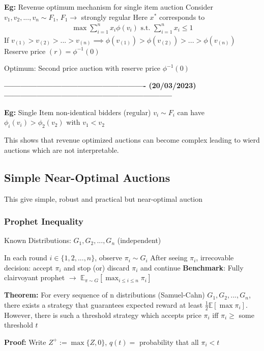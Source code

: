 \documentclass[11pt]{article}
\begin{document}
\textbf{Eg:} Revenue optimum mechanism for single item auction
Consider \(v_1, v_2, ..., v_n \sim F_1\), \(F_1 \rightarrow\) strongly regular
Here \(x^{*}\) corresponds to
\begin{align*}
\max \sum_{i=1}^n x_i \phi(v_i) \text{  s.t.  } \sum_{i=1}^n x_i \leq 1
\end{align*}
If \(v_{(1)} > v_{(2)} > ... > v_{(n)} \implies \phi(v_{(1)}) > \phi(v_{(2)}) > ... > \phi(v_{(n)})\) 
Reserve price \((r) = \phi^{-1}(0)\)

Optimum: Second price auction with reserve price \(\phi^{-1}(0)\)

\textbf{---------------------------------------------------- (20/03/2023)--------------------------------------------------------------}

\textbf{Eg:} Single Item non-identical bidders (regular) \(v_i \sim F_i\) can have \(\phi_i(v_i) > \phi_2(v_2)\) with \(v_1 < v_2\)

This shows that revenue optimized auctions can become complex leading to wierd auctions which are not interpretable.

\subsection{Simple Near-Optimal Auctions}
\label{sec:orgec528af}
This give simple, robust and practical but near-optimal auction

\subsubsection{Prophet Inequality}
\label{sec:orgc14e930}
Known Distributions: \(G_1, G_2, ..., G_n\) (independent)

In each round \(i \in \{1, 2, ..., n\}\), observe \(\pi_i \sim G_i\)
After seeing \(\pi_i\), irrecovable decision: accept \(\pi_i\) and stop (or) discard \(\pi_i\) and continue
\textbf{Benchmark}: Fully clairvoyant prophet \(\rightarrow\) \(\mathbb{E}_{\pi \sim G} [\max_{i \leq i \leq n} \pi_i]\)

\textbf{Theorem:} For every sequence of n distributions (Samuel-Cahn) \(G_1, G_2, ..., G_n\), there exists a strategy that
guarantees expected reward at least \(\frac{1}{2} \mathbb{E}[\max \pi_{i}]\). However, there is such a threshold strategy which accepts
price \(\pi_i\)  iff \(\pi_i \geq\) some threshold \(t\)

\textbf{Proof:} Write \(Z^{+} := \max \{Z, 0\}\), \(q(t) =\) probability that all \(\pi_i < t\)
\end{document}
